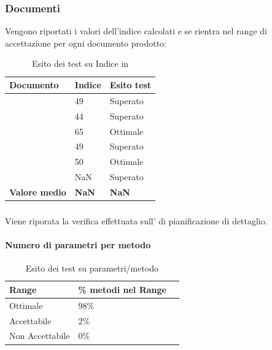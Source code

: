 \documentclass[12pt,a4paper]{article}
\begin{document}
\subsubsection{Documenti}
Vengono riportati i valori dell'indice  calcolati e se rientra nel range di accettazione per ogni documento prodotto:
			\begin{table}[H]
				\begin{center}
					\begin{tabular}{p{} p{0.3\textwidth} p{}}
						\toprule
						\textbf{Documento}   & \textbf{Indice \mgls{gulpease}}	& \textbf{Esito test} \\ \midrule
						\midrule
						\NdP & 49 &  Superato \\ \midrule
						\SdF & 44 &  Superato \\ \midrule
						\AdR & 65 &  Ottimale \\ \midrule
						\PdP & 49 &  Superato \\ \midrule
						\PdQ & 50 &  Ottimale \\ \midrule
						\DP & NaN  &  Superato \\ \midrule \midrule
						\textbf{Valore medio} & \textbf{NaN}& \textbf{NaN}\\ 
						\bottomrule
					\end{tabular}
				\end{center}
				\caption{Esito dei test su Indice \mgls{gulpease} in \FPD}
			\end{table}

\subsubsection{ }
Viene riporata la verifica effettuata sull'  di pianificazione di dettaglio. 
\paragraph{Numero di parametri per metodo}
\begin{table}[H]
	\begin{center}
		\begin{tabular}{p{} p{} p{}}
			\toprule
			\textbf{Range}   & \textbf{\% metodi nel Range}	 \\ \midrule
			\midrule
			Ottimale & 98\% \\ \midrule
			Accettabile & 2\%  \\ \midrule
			Non Accettabile  & 0\%  \\ \midrule
			\bottomrule
		\end{tabular}
	\end{center}
	\caption{Esito dei test su  parametri/metodo}
\end{table}
\end{document}

